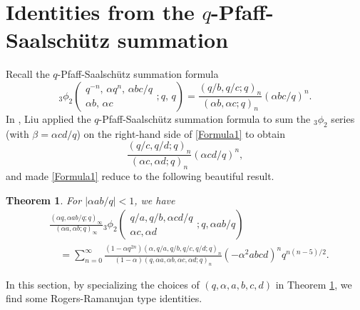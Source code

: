 \documentclass[reqno,12pt]{amsart}
\newtheorem{theorem}{Theorem}[section]%
\theoremstyle{remark}
\numberwithin{equation}{section}
\begin{document}
\section{Identities from the $q$-Pfaff-Saalsch\"utz summation}\label{sec3}
Recall the $q$-Pfaff-Saalsch\"utz summation formula \cite[Eq. (1.7.2)]{Gasper_and_Rahman}
\begin{equation}\label{Pfaff}
_3\phi_2\left(
\begin{array}{ccc}
q^{-n},\,\alpha q^n,\,\alpha bc/q\\
\alpha b,\,\alpha c
\end{array};q,\,q\right)=\frac{\left(q/b,q/c;q\right)_{n}}
{\left(\alpha b,\alpha c;q\right)_n}\left(\alpha bc/{q}\right)^n.
\end{equation}
In \cite{Liu2}, Liu applied the $q$-Pfaff-Saalsch\"utz summation formula to sum the $_3\phi_2$ series (with $\beta=\alpha cd/q$)  on the right-hand side of \eqref{Formula1} to obtain
\begin{equation*}
  \frac{\left(q/c,q/d;q\right)_n}{\left(\alpha c,\alpha d;q\right)_n}\left(\alpha cd/q\right)^n,
\end{equation*}
and made \eqref{Formula1} reduce to the following beautiful result.
\begin{theorem}\label{thm2}
For $|\alpha ab/q|<1$, we have
\begin{align}
&\frac{\left(\alpha q,\alpha ab/q;q\right)_{\infty}}{\left(\alpha a,\alpha b;q\right)_{\infty}}{_3\phi_2}\left(
\begin{array}{ccc}
q/a,q/b,\alpha cd/q\\
\alpha c,\alpha d
\end{array};q,{\alpha ab}/{q}\right)\nonumber\\
&\quad=
\sum_{n=0}^{\infty}\frac{\left(1-\alpha q^{2n}\right)
\left(\alpha,q/a,q/b,q/c,q/d;q\right)_n}{\left(1-\alpha\right)\left(q,\alpha a,\alpha b,\alpha c,\alpha d;q\right)_n}
\left(-\alpha^2abcd\right)^n
q^{n\left(n-5\right)/2}
.\label{B4}
\end{align}
\end{theorem}
In this section, by specializing the choices of $\left(q,\alpha,a,b,c,d\right)$ in Theorem \ref{thm2}, we  
find some Rogers-Ramanujan type identities.%
\end{document}
